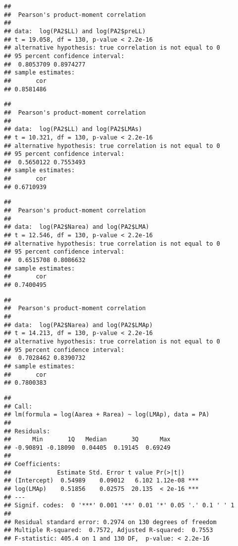 \documentclass[12pt,]{article}
\begin{document}
\begin{verbatim}
## 
##  Pearson's product-moment correlation
## 
## data:  log(PA2$LL) and log(PA2$preLL)
## t = 19.058, df = 130, p-value < 2.2e-16
## alternative hypothesis: true correlation is not equal to 0
## 95 percent confidence interval:
##  0.8053709 0.8974277
## sample estimates:
##       cor 
## 0.8581486
\end{verbatim}

\begin{verbatim}
## 
##  Pearson's product-moment correlation
## 
## data:  log(PA2$LL) and log(PA2$LMAs)
## t = 10.321, df = 130, p-value < 2.2e-16
## alternative hypothesis: true correlation is not equal to 0
## 95 percent confidence interval:
##  0.5650122 0.7553493
## sample estimates:
##       cor 
## 0.6710939
\end{verbatim}

\begin{verbatim}
## 
##  Pearson's product-moment correlation
## 
## data:  log(PA2$Narea) and log(PA2$LMA)
## t = 12.546, df = 130, p-value < 2.2e-16
## alternative hypothesis: true correlation is not equal to 0
## 95 percent confidence interval:
##  0.6515708 0.8086632
## sample estimates:
##       cor 
## 0.7400495
\end{verbatim}

\begin{verbatim}
## 
##  Pearson's product-moment correlation
## 
## data:  log(PA2$Narea) and log(PA2$LMAp)
## t = 14.213, df = 130, p-value < 2.2e-16
## alternative hypothesis: true correlation is not equal to 0
## 95 percent confidence interval:
##  0.7028462 0.8390732
## sample estimates:
##       cor 
## 0.7800383
\end{verbatim}

\begin{verbatim}
## 
## Call:
## lm(formula = log(Aarea + Rarea) ~ log(LMAp), data = PA)
## 
## Residuals:
##      Min       1Q   Median       3Q      Max 
## -0.90891 -0.18090  0.04405  0.19145  0.69249 
## 
## Coefficients:
##             Estimate Std. Error t value Pr(>|t|)    
## (Intercept)  0.54989    0.09012   6.102 1.12e-08 ***
## log(LMAp)    0.51856    0.02575  20.135  < 2e-16 ***
## ---
## Signif. codes:  0 '***' 0.001 '**' 0.01 '*' 0.05 '.' 0.1 ' ' 1
## 
## Residual standard error: 0.2974 on 130 degrees of freedom
## Multiple R-squared:  0.7572, Adjusted R-squared:  0.7553 
## F-statistic: 405.4 on 1 and 130 DF,  p-value: < 2.2e-16
\end{verbatim}
\end{document}
